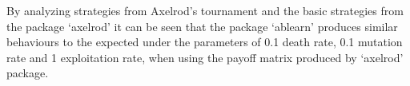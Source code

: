 By analyzing strategies from Axelrod's tournament and the basic strategies from the package `axelrod' it can be seen that the package `ablearn' produces similar behaviours to the expected  under the parameters of 0.1 death rate, 0.1 mutation rate and 1 exploitation rate, when using the payoff matrix produced by `axelrod' package.
